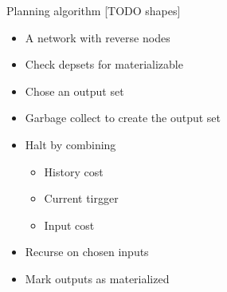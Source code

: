 \begin{frame}{Planning algorithm [TODO shapes]}
  \begin{itemize}
  \item A network with reverse nodes
  \item Check depsets for materializable
  \item Chose an output set
  \item Garbage collect to create the output set
  \item Halt by combining
    \begin{itemize}
    \item History cost
    \item Current tirgger
    \item Input cost
    \end{itemize}
  \item Recurse on chosen inputs
  \item Mark outputs as materialized
  \end{itemize}
\end{frame}
